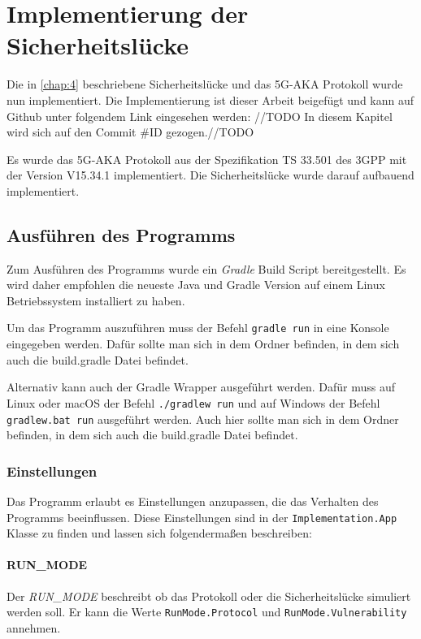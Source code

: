 \chapter{Implementierung der Sicherheitsl\"ucke}
\label{chap:5}

Die in \cref{chap:4} beschriebene Sicherheitslücke und das 5G-AKA Protokoll wurde nun implementiert.
Die Implementierung ist dieser Arbeit beigefügt und kann auf Github unter folgendem Link eingesehen werden: \url{}//TODO
In diesem Kapitel wird sich auf den Commit \#ID gezogen.//TODO

Es wurde das 5G-AKA Protokoll aus der Spezifikation TS 33.501 des 3GPP mit der Version V15.34.1 implementiert.
Die Sicherheitslücke wurde darauf aufbauend implementiert.


\section{Ausführen des Programms}
Zum Ausführen des Programms wurde ein \textit{Gradle} Build Script bereitgestellt.
Es wird daher empfohlen die neueste Java und Gradle Version auf einem Linux Betriebssystem installiert zu haben.

Um das Programm auszuführen muss der Befehl \lstinline{gradle run} in eine Konsole eingegeben werden.
Dafür sollte man sich in dem Ordner befinden, in dem sich auch die build.gradle Datei befindet.

Alternativ kann auch der Gradle Wrapper ausgeführt werden.
Dafür muss auf Linux oder macOS der Befehl \lstinline{./gradlew run} und auf Windows der Befehl \lstinline{gradlew.bat run} ausgeführt werden.
Auch hier sollte man sich in dem Ordner befinden, in dem sich auch die build.gradle Datei befindet.

\subsection{Einstellungen}

Das Programm erlaubt es Einstellungen anzupassen, die das Verhalten des Programms beeinflussen.
Diese Einstellungen sind in der \lstinline{Implementation.App} Klasse zu finden und lassen sich folgendermaßen beschreiben:

\subsubsection{RUN\_MODE}
Der \textit{RUN\_MODE} beschreibt ob das Protokoll oder die Sicherheitslücke simuliert werden soll.
Er kann die Werte \lstinline{RunMode.Protocol} und \lstinline{RunMode.Vulnerability} annehmen.

